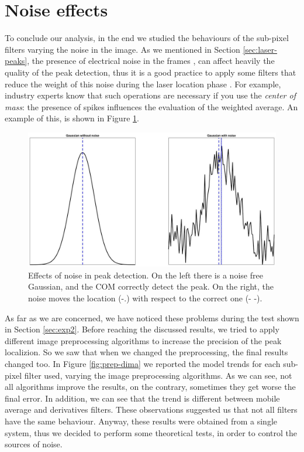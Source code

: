 \section{Noise effects}
To conclude our analysis, in the end we studied the behaviours of the sub-pixel filters varying the noise in the image. As we mentioned in Section \ref{sec:laser-peaks}, the presence of electrical noise in the frames \cite{1334612}, can affect heavily the quality of the peak detection, thus it is a good practice to apply some filters that reduce the weight of this noise during the laser location phase \cite{Naidu1991}. For example, industry experts know that such operations are necessary if you use the \textit{center of mass}: the presence of spikes influences the evaluation of the weighted average. An example of this, is shown in Figure \ref{fig:noise-es}. \\
  \begin{figure}[t!]
    \centering
    \includegraphics[width=\textwidth]{./images/analysis/noise/electrical.jpg}
    \caption{Effects of noise in peak detection. On the left there is a noise free Gaussian, and the \acs{COM} correctly detect the peak. On the right, the noise moves the location (-.) with respect to the correct one (- -).}
    \label{fig:noise-es}
  \end{figure}
  
As far as we are concerned, we have noticed these problems during the test shown in Section \ref{sec:exp2}. Before reaching the discussed results, we tried to apply different image preprocessing algorithms to increase the precision of the peak localizion. So we saw that when we changed the preprocessing, the final results changed too. In Figure \ref{fig:prep-dima} we reported the model trends for each sub-pixel filter used, varying the image preprocessing algorithms. As we can see, not all algorithms improve the results, on the contrary, sometimes they get worse the final error. In addition, we can see that the trend is different between mobile average and derivatives filters. These observations suggested us that not all filters have the same behaviour. Anyway, these results were obtained from a single system, thus we decided to perform some theoretical tests, in order to control the sources of noise. \\

